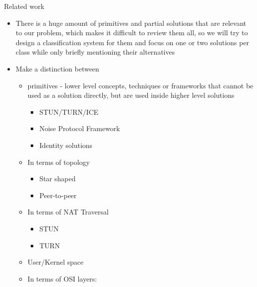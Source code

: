 \hypertarget{notes__02000-related-work.md}{}
\begin{frame}{Related work}
\protect\hypertarget{notes__02000-related-work.md__related-work}{}
\begin{itemize}
\item
  There is a huge amount of primitives and partial solutions that are
  relevant to our problem, which makes it difficult to review them all,
  so we will try to design a classification system for them and focus on
  one or two solutions per class while only briefly mentioning their
  alternatives
\item
  Make a distinction between

  \begin{itemize}
  \tightlist
  \item
    primitives - lower level concepts, techniques or frameworks that
    cannot be used as a solution directly, but are used inside higher
    level solutions

    \begin{itemize}
    \tightlist
    \item
      STUN/TURN/ICE
    \item
      Noise Protocol Framework
    \item
      Identity solutions
    \end{itemize}
  \item
    In terms of topology

    \begin{itemize}
    \tightlist
    \item
      Star shaped
    \item
      Peer-to-peer
    \end{itemize}
  \item
    In terms of NAT Traversal

    \begin{itemize}
    \tightlist
    \item
      STUN
    \item
      TURN
    \end{itemize}
  \item
    User/Kernel space
  \item
    In terms of OSI layers:


\end{itemize}
\end{itemize}
\end{frame}
